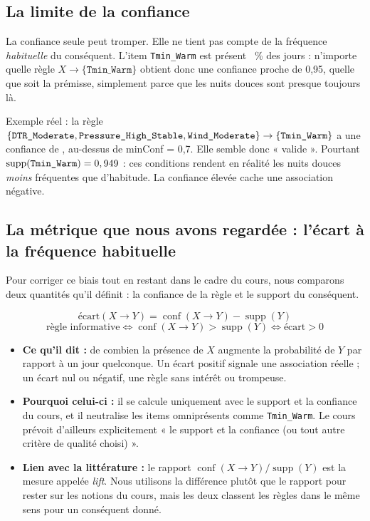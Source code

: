 \documentclass[12pt, a4paper]{article}
\newcommand{\itm}[1]{\texttt{#1}}
\begin{document}
\subsection{La limite de la confiance}

La confiance seule peut tromper. Elle ne tient pas compte de la fréquence \emph{habituelle} du
conséquent. L'item \itm{Tmin\_Warm} est présent \pTminWarm~\% des jours : n'importe quelle
règle $X \rightarrow \{\itm{Tmin\_Warm}\}$ obtient donc une confiance proche de 0,95, quelle que
soit la prémisse, simplement parce que les nuits douces sont presque toujours là.

\begin{remarque}
Exemple réel : la règle $\{\pieceX\} \rightarrow \{\itm{Tmin\_Warm}\}$ a une confiance de
\pieceConf, au-dessus de minConf = 0,7. Elle semble donc « valide ». Pourtant
$\operatorname{supp}(\itm{Tmin\_Warm}) = \pieceSuppY$ : ces conditions rendent en réalité les
nuits douces \emph{moins} fréquentes que d'habitude. La confiance élevée cache une association
négative.
\end{remarque}

\subsection{La métrique que nous avons regardée : l'écart à la fréquence habituelle}

Pour corriger ce biais tout en restant dans le cadre du cours, nous comparons deux quantités
qu'il définit : la confiance de la règle et le support du conséquent.

\begin{formule}
\[
\text{écart}(X \rightarrow Y) = \operatorname{conf}(X \rightarrow Y) - \operatorname{supp}(Y)
\]
\[
\text{règle informative} \iff \operatorname{conf}(X \rightarrow Y) > \operatorname{supp}(Y)
\iff \text{écart} > 0
\]
\end{formule}

\begin{itemize}
  \item \textbf{Ce qu'il dit :} de combien la présence de $X$ augmente la probabilité de $Y$ par
        rapport à un jour quelconque. Un écart positif signale une association réelle ; un écart
        nul ou négatif, une règle sans intérêt ou trompeuse.
  \item \textbf{Pourquoi celui-ci :} il se calcule uniquement avec le support et la confiance
        du cours, et il neutralise les items omniprésents comme \itm{Tmin\_Warm}. Le cours
        prévoit d'ailleurs explicitement « le support et la confiance (ou tout autre critère de
        qualité choisi) ».
  \item \textbf{Lien avec la littérature :} le rapport
        $\operatorname{conf}(X \rightarrow Y) / \operatorname{supp}(Y)$ est la mesure appelée
        \emph{lift}. Nous utilisons la différence plutôt que le rapport pour rester sur les
        notions du cours, mais les deux classent les règles dans le même sens pour un
        conséquent donné.
\end{itemize}
\end{document}

